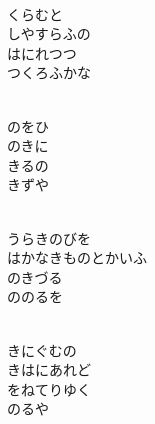 \documentclass[10pt,b5j]{tarticle} %
\begin{document}
\vspace{1.5em} %
\newcommand{\linespace}{0.5em} %
\newcommand{\blocksize}{0.5\hsize} %
\newcommand{\itemmargin}{6em} %
\begin{enumerate} %
    \setlength{\itemindent}{\itemmargin} %
    \begin{minipage}[c]{\blocksize}
    
        \vspace{\linespace}
        \item~\\
        くらむと\\
        しやすらふの\\
        はにれつつ\\
        つくろふかな
        
        \vspace{\linespace}
        \item~\\
        のをひ\\
        のきに\\
        きるの\\
        きずや
        
        \vspace{\linespace}
        \item~\\
        うらきのびを\\
        はかなきものとかいふ\\
        のきづる\\
        ののるを
        
        \vspace{\linespace}
        \item~\\
        きにぐむの\\
        きはにあれど\\
        をねてりゆく\\
        のるや
        

\end{minipage}
\end{enumerate}
\end{document}
